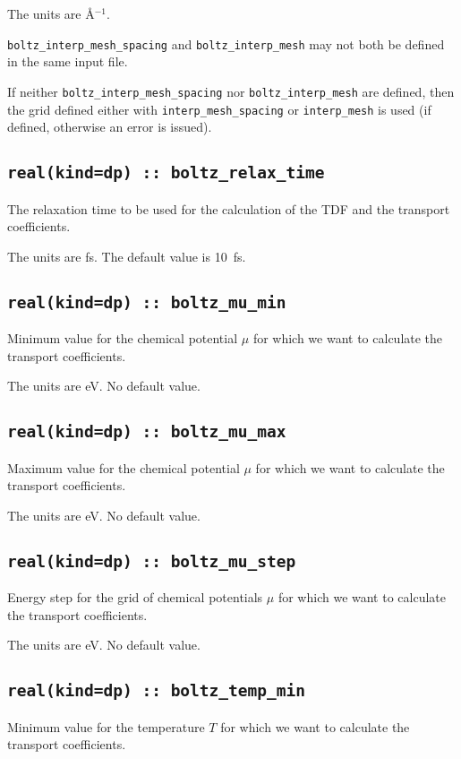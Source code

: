 The units are \AA$^{-1}$.

{\tt boltz\_interp\_mesh\_spacing} and  {\tt boltz\_interp\_mesh} may not both be defined in the same input file.

If neither {\tt boltz\_interp\_mesh\_spacing} nor  {\tt boltz\_interp\_mesh} are defined, then the grid defined either with {\tt interp\_mesh\_spacing} or {\tt interp\_mesh} is used (if defined, otherwise an error is issued).

\subsection[boltz\_relax\_time]{\tt real(kind=dp) :: boltz\_relax\_time}
The relaxation time to be used for the calculation of the TDF and the transport coefficients.

The units are fs.
The default value is 10~fs.

\subsection[boltz\_mu\_min]{\tt real(kind=dp) :: boltz\_mu\_min}
Minimum value for the chemical potential $\mu$ for which we want to calculate the transport coefficients.

The units are eV.
No default value.

\subsection[boltz\_mu\_max]{\tt real(kind=dp) :: boltz\_mu\_max}
Maximum value for the chemical potential $\mu$ for which we want to calculate the transport coefficients.

The units are eV.
No default value.

\subsection[boltz\_mu\_step]{\tt real(kind=dp) :: boltz\_mu\_step}
Energy step for the grid of chemical potentials $\mu$ for which we want to calculate the transport coefficients.

The units are eV.
No default value.

\subsection[boltz\_temp\_min]{\tt real(kind=dp) :: boltz\_temp\_min}
Minimum value for the temperature $T$ for which we want to calculate the transport coefficients.

